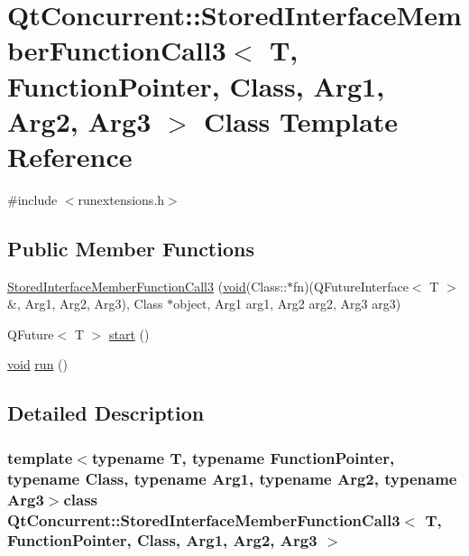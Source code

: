 \hypertarget{class_qt_concurrent_1_1_stored_interface_member_function_call3}{\section{\-Qt\-Concurrent\-:\-:\-Stored\-Interface\-Member\-Function\-Call3$<$ \-T, \-Function\-Pointer, \-Class, \-Arg1, \-Arg2, \-Arg3 $>$ \-Class \-Template \-Reference}
\label{class_qt_concurrent_1_1_stored_interface_member_function_call3}
}


{\ttfamily \#include $<$runextensions.\-h$>$}

\subsection*{\-Public \-Member \-Functions}
\begin{DoxyCompactItemize}
\item 
\hyperlink{class_qt_concurrent_1_1_stored_interface_member_function_call3_a3d00b369a5301f8c2bebbb5d92214956}{\-Stored\-Interface\-Member\-Function\-Call3} (\hyperlink{group___u_a_v_objects_plugin_ga444cf2ff3f0ecbe028adce838d373f5c}{void}(\-Class\-::$\ast$fn)(\-Q\-Future\-Interface$<$ \-T $>$ \&, \-Arg1, \-Arg2, \-Arg3), \-Class $\ast$object, \-Arg1 arg1, \-Arg2 arg2, \-Arg3 arg3)
\item 
\-Q\-Future$<$ \-T $>$ \hyperlink{class_qt_concurrent_1_1_stored_interface_member_function_call3_a0b245d90811f994319be044d9450c41b}{start} ()
\item 
\hyperlink{group___u_a_v_objects_plugin_ga444cf2ff3f0ecbe028adce838d373f5c}{void} \hyperlink{class_qt_concurrent_1_1_stored_interface_member_function_call3_ac6f859dc60f607efad6801d43cd4f75f}{run} ()
\end{DoxyCompactItemize}


\subsection{\-Detailed \-Description}
\subsubsection*{template$<$typename T, typename Function\-Pointer, typename Class, typename Arg1, typename Arg2, typename Arg3$>$class Qt\-Concurrent\-::\-Stored\-Interface\-Member\-Function\-Call3$<$ T, Function\-Pointer, Class, Arg1, Arg2, Arg3 $>$}



